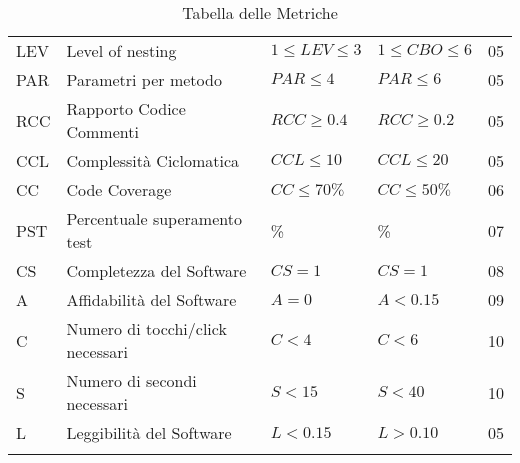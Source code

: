 \begin{longtable}{ 
		>{\centering}p{} 
		>{}p{}
        >{\centering}p{}
        >{\centering}p{}
        >{}p{} }
            LEV & Level of nesting & $1\leq LEV \leq 3$ & $1\leq CBO \leq 6$ & 05 \\

            PAR & Parametri per metodo & $PAR \leq 4$ & $PAR \leq 6$ & 05 \\

            RCC & Rapporto Codice Commenti & $RCC \geq 0.4$ & $RCC \geq 0.2$  & 05 \\

            CCL & Complessità Ciclomatica & $CCL \leq 10 $ & $CCL \leq 20 $& 05 \\

            CC & Code Coverage & $CC\leq 70\%$ & $CC\leq 50\%$ & 06 \\

            PST & Percentuale superamento test & 100\% & 85\% & 07 \\


            CS & Completezza del Software & $CS=1$ & $CS=1$ & 08 \\

            A & Affidabilità del Software & $A=0$ & $A < 0.15$ & 09 \\

           C & Numero di tocchi/click necessari & $C<4$ & $C<6$& 10 \\

           S & Numero di secondi necessari & $S<15$ & $S<40$ & 10 \\

           L & Leggibilità del Software & $L<0.15$ & $L>0.10$ & 05 \\
           \caption{Tabella delle Metriche}
        \end{longtable}


